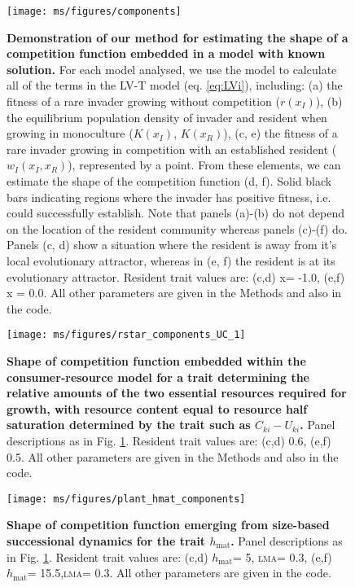 \documentclass[a4paper,11pt]{article}
\newcommand{\hmat}{\ensuremath{h_{\text{mat}}}}
\newcommand{\lma}{\textsc{lma}}
\begin{document}
\clearpage

\begin{figure}[ht]
 \centering
 \texttt{[image: ms/figures/components]}
 \caption{{\bf Demonstration of our method for estimating the shape of a competition function embedded in a model with known solution.} For each model analysed, we use the model to calculate all of the terms in the LV-T model (eq. \ref{eq:LVi}), including: (a) the fitness of a rare invader growing without competition ($r(x_I)$), (b) the equilibrium population density of invader and resident when growing in monoculture ($K(x_I)$, $K(x_R)$), (c, e) the fitness of a rare invader growing in competition with an established resident ($w_I(x_I, x_R)$), represented by a point. From these elements, we can estimate the shape of the competition function (d, f). Solid black bars indicating regions where the invader has positive fitness, i.e. could successfully establish. Note that panels (a)-(b) do not depend on the location of the resident community whereas panels (c)-(f) do. Panels (c, d) show a situation where the resident is away from it's local evolutionary attractor, whereas in (e, f) the resident is at its evolutionary attractor. Resident trait values are: (c,d) x= -1.0, (e,f) x = 0.0. All other parameters are given in the Methods and also in the code.}
\label{fig:components}
\end{figure}

\clearpage


\clearpage

\begin{figure}[ht]
 \centering
 \texttt{[image: ms/figures/rstar\_components\_UC\_1]}
 \caption{{\bf Shape of competition function embedded within the consumer-resource model for a trait determining the relative amounts of the two essential resources required for growth, with resource content equal to resource half saturation determined by the trait such as $C_{ki} - U_{ki}$.} Panel descriptions as in Fig. \ref{fig:components}. Resident trait values are: (c,d) 0.6, (e,f) 0.5. All other parameters are given in the Methods and also in the code.} 
 \label{fig:rstar_components_UC1}
\end{figure}


\clearpage

\begin{figure}[ht]
 \centering
 \texttt{[image: ms/figures/plant\_hmat\_components]}
 \caption{{\bf Shape of competition function emerging from size-based successional dynamics for the trait \hmat.} 
	Panel descriptions as in Fig. \ref{fig:components}. Resident trait values are: (c,d) \hmat = 5, \lma = 0.3, (e,f) \hmat = 15.5,\lma = 0.3. All other parameters are given in the code.}
 \label{fig:plant_hmat}
\end{figure}
\end{document}
